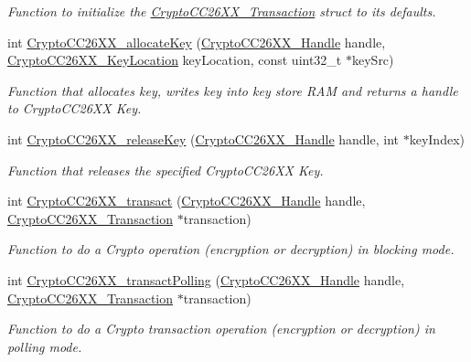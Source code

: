 \begin{DoxyCompactItemize}
\begin{DoxyCompactList}\small\item\em Function to initialize the \hyperlink{struct_crypto_c_c26_x_x___transaction}{Crypto\-C\-C26\-X\-X\-\_\-\-Transaction} struct to its defaults. \end{DoxyCompactList}\item 
int \hyperlink{_crypto_c_c26_x_x_8h_a50d5828043e87fd37398d2aabe9b9e92}{Crypto\-C\-C26\-X\-X\-\_\-allocate\-Key} (\hyperlink{_crypto_c_c26_x_x_8h_a8737c63107a1cb5548ba06f7a48259b5}{Crypto\-C\-C26\-X\-X\-\_\-\-Handle} handle, \hyperlink{_crypto_c_c26_x_x_8h_a5266637af2c4ac36ed58d4e0f158b706}{Crypto\-C\-C26\-X\-X\-\_\-\-Key\-Location} key\-Location, const uint32\-\_\-t $\ast$key\-Src)
\begin{DoxyCompactList}\small\item\em Function that allocates key, writes key into key store R\-A\-M and returns a handle to Crypto\-C\-C26\-X\-X Key. \end{DoxyCompactList}\item 
int \hyperlink{_crypto_c_c26_x_x_8h_aa995ee20d8a7fcce66aeae86fee83555}{Crypto\-C\-C26\-X\-X\-\_\-release\-Key} (\hyperlink{_crypto_c_c26_x_x_8h_a8737c63107a1cb5548ba06f7a48259b5}{Crypto\-C\-C26\-X\-X\-\_\-\-Handle} handle, int $\ast$key\-Index)
\begin{DoxyCompactList}\small\item\em Function that releases the specified Crypto\-C\-C26\-X\-X Key. \end{DoxyCompactList}\item 
int \hyperlink{_crypto_c_c26_x_x_8h_a6864191d34a9a3cfbcd36cc34570b3b8}{Crypto\-C\-C26\-X\-X\-\_\-transact} (\hyperlink{_crypto_c_c26_x_x_8h_a8737c63107a1cb5548ba06f7a48259b5}{Crypto\-C\-C26\-X\-X\-\_\-\-Handle} handle, \hyperlink{struct_crypto_c_c26_x_x___transaction}{Crypto\-C\-C26\-X\-X\-\_\-\-Transaction} $\ast$transaction)
\begin{DoxyCompactList}\small\item\em Function to do a Crypto operation (encryption or decryption) in blocking mode. \end{DoxyCompactList}\item 
int \hyperlink{_crypto_c_c26_x_x_8h_a2efbef5e059c752e1f5797a4ef3713a3}{Crypto\-C\-C26\-X\-X\-\_\-transact\-Polling} (\hyperlink{_crypto_c_c26_x_x_8h_a8737c63107a1cb5548ba06f7a48259b5}{Crypto\-C\-C26\-X\-X\-\_\-\-Handle} handle, \hyperlink{struct_crypto_c_c26_x_x___transaction}{Crypto\-C\-C26\-X\-X\-\_\-\-Transaction} $\ast$transaction)
\begin{DoxyCompactList}\small\item\em Function to do a Crypto transaction operation (encryption or decryption) in polling mode. \end{DoxyCompactList}\item 

\end{DoxyCompactItemize}
